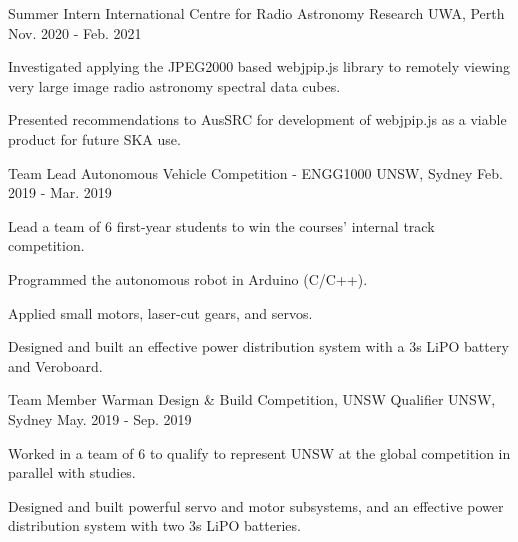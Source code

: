 \vspace{\acvSectionTopSkip}


\begin{cventries}

  \cventry
    {Summer Intern} %
    {International Centre for Radio Astronomy Research} %
    {UWA, Perth} %
    {Nov. 2020 - Feb. 2021} %
    {
      \begin{cvitems} %
        \item {Investigated applying the JPEG2000 based webjpip.js library to remotely viewing very large image radio astronomy spectral data cubes.}
        \item {Presented recommendations to AusSRC for development of webjpip.js as a viable product for future SKA use.}
      \end{cvitems}
    }

  \cventry
    {Team Lead} %
    {Autonomous Vehicle Competition - ENGG1000} %
    {UNSW, Sydney} %
    {Feb. 2019 - Mar. 2019} %
    {
      \begin{cvitems} %
        \item {Lead a team of 6 first-year students to win the courses’ internal track competition.}
        \item {Programmed the autonomous robot in Arduino (C/C++).}
        \item {Applied small motors, laser-cut gears, and servos.}
        \item {Designed and built an effective power distribution system with a 3s LiPO battery and Veroboard.}
      \end{cvitems}
    }

  \cventry
    {Team Member} %
    {Warman Design \& Build Competition, UNSW Qualifier} %
    {UNSW, Sydney} %
    {May. 2019 - Sep. 2019} %
    {
      \begin{cvitems} %
        \item {Worked in a team of 6 to qualify to represent UNSW at the global competition in parallel with studies.}
        \item {Designed and built powerful servo and motor subsystems, and an effective power distribution system with two 3s LiPO batteries.}
      \end{cvitems}
    }


\end{cventries}
